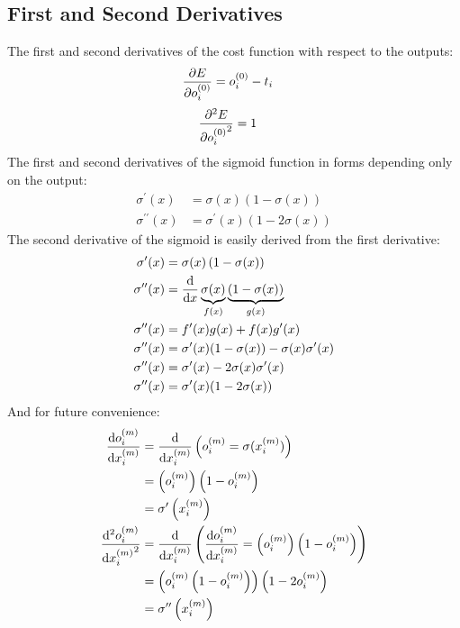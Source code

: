 \subsection{First and Second Derivatives} 
The first and second derivatives of the cost function with respect to the outputs:
\begin{align}
\pdv{E}{o_{i}^{(0)}} &= o_{i}^{(0)} - t_{i} \label{cost_func_derivative}
\end{align}
\begin{align}
\pdv[2]{E}{{o_{i}^{(0)}}} &= 1\label{cost_func_2nd_derivative}
\end{align}
The first and second derivatives of the sigmoid function in forms depending only on the output:
\begin{align}
\sigma^{\prime}(x) &= \sigma(x)\left(1 - \sigma(x)\right)\label{sigmoid_derivative} 
\\
\sigma^{\prime\prime}(x) &= \sigma^{\prime}(x)\left(1 - 2\sigma(x)\right) \label{sigmoid_2nd_derivative}
\end{align}
The second derivative of the sigmoid is easily derived from the first derivative:
\begin{align}
\sigma^{\prime}(x) &= \sigma(x)\left(1 - \sigma(x)\right)
\\
\sigma^{\prime\prime}(x) &= \dv{}{x}
\underbrace{\sigma(x)}_{f(x)}
\underbrace{\left(1 - \sigma(x)\right)}_{g(x)}
\\
\sigma^{\prime\prime}(x) &= f^{\prime}(x)g(x) + f(x)g^{\prime}(x)
\\
\sigma^{\prime\prime}(x) &= \sigma^{\prime}(x)(1-\sigma(x)) - \sigma(x)\sigma^{\prime}(x)
\\
\sigma^{\prime\prime}(x) &= \sigma^{\prime}(x) - 2\sigma(x)\sigma^{\prime}(x)
\\
\sigma^{\prime\prime}(x) &= \sigma^{\prime}(x)(1 - 2\sigma(x))
\end{align}
And for future convenience: 
\begin{align}
\dv{o_{i}^{(m)}}{x_{i}^{(m)}} &= 
\dv{}{x_{i}^{(m)}}\left({o_{i}^{(m)}} = \sigma(x_{i}^{(m)})\right) 
\\
&= \left(o_{i}^{(m)}\right)\left(1 - o_{i}^{(m)}\right)
\\
&= \sigma^{\prime}\left(x_{i}^{(m)}\right)
\\
\dv[2]{{o_{i}^{(m)}}}{{x_{i}^{(m)}}} &=
\dv{}{{x_{i}^{(m)}}}\left(\dv{o_{i}^{(m)}}{x_{i}^{(m)}} = \left(o_{i}^{(m)}\right)\left(1 - o_{i}^{(m)}\right)\right)
\\
&= \left(o_{i}^{(m)}\left(1 - o_{i}^{(m)}\right)\right)\left(1 - 2o_{i}^{(m)}\right)
\\
&= \sigma^{\prime\prime}\left(x_{i}^{(m)}\right)
\end{align}
